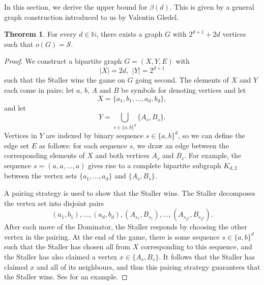 \documentclass[a4paper,11pt,oneside]{scrartcl}
\theoremstyle{definition}
\newtheorem{theorem}[definition]{Theorem}
\theoremstyle{remark}
\begin{document}
In this section, we derive the upper bound for $\beta(d)$. This is given by a general graph construction introduced to us by Valentin Gledel.

\begin{theorem}\label{proposition:g-construction}
    For every $d \in \mathbb N$, there exists a graph $G$ with $2^{d+1}+2d$ vertices such that $o(G)= \mathcal S$.
\end{theorem}

\begin{proof}
    We construct a bipartite graph $G=(X,Y,E)$ with
    \[
        |X|=2d, \,\ |Y|=2^{d+1}
    \]
    such that the Staller wins the game on $G$ going second. The elements of $X$ and $Y$ each come in pairs; let $a$, $b$, $A$ and $B$ be symbols for denoting vertices and let
    \[
        X=\{a_1,b_1,\dots , a_d,b_d \},
    \]
    and let
    \[
        Y=\bigcup_{s \in \{a,b\}^d} \{A_s,B_s \}.
    \]
    Vertices in $Y$ are indexed by binary sequence $s \in \{a,b\}^d$, so we can define the edge set $E$ as follows: for each sequence $s$, we draw an edge between the corresponding elements of $X$ and both vertices $A_s$ and $B_s$. For example, the sequence $s=(a,a,\dots,a)$ gives rise to a complete bipartite subgraph $K_{d,2}$ between the vertex sets $\{ a_1, \dots, a_d \}$ and $\{A_s,B_s\}$.

    A pairing strategy is used to show that the Staller wins. The Staller decomposes the vertex set into disjoint pairs 
    \[
        (a_1,b_1), \dots , (a_d,b_d), (A_{s_1}, B_{s_1}), \dots, (A_{s_{2^d}}, B_{s_{2^d}}).
    \]
    After each move of the Dominator, the Staller responds by choosing the other vertex in the pairing. At the end of the game, there is some sequence $s \in \{a,b\}^d$ such that the Staller has chosen all from $X$ corresponding to this sequence, and the Staller has also claimed a vertex $x \in \{A_s, B_s \}$. It follows that the Staller has claimed $x$ and all of its neighbours, and thus this pairing strategy guarantees that the Staller wins.
    See  for an example.
\end{proof}
\end{document}
